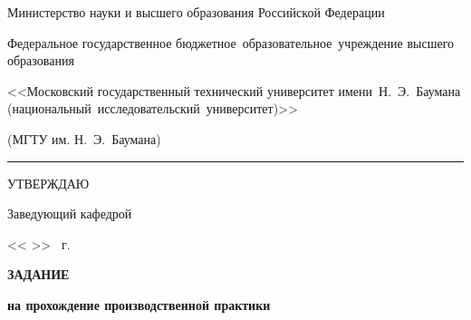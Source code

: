 \thispagestyle{empty}

\fontsize{12pt}{12pt}\selectfont
\begin{center}
	{
		
		
		\begin{minipage}{0.99\textwidth}\centering\bfseries
			{
				\linespread{1}\selectfont
				{Министерство науки и высшего образования Российской Федерации}
				
				{Федеральное государственное бюджетное~образовательное~учреждение высшего образования}
				
				{<<Московский государственный технический университет имени~Н.~Э.~Баумана (национальный~исследовательский~университет)>>}
				
				{(МГТУ им. Н.~Э.~Баумана)}
			}
		\end{minipage}
	}
	
	\vspace{0.2cm}
	
	\rule{\linewidth}{3.4pt}
\end{center}

\fontsize{11pt}{11pt}\selectfont
\begin{flushright}
	\begin{minipage}{0.4\textwidth}\raggedleft
		
		УТВЕРЖДАЮ \hspace{2.5cm}
		
		Заведующий кафедрой~
		
		\vspace{0.3cm}
		
		\ulinetext{}{} 
		
		\vspace{0.3cm}
		
		<< \ulinetext[1cm]{}{} >> \ulinetext{}{} \the\year \ г.
	\end{minipage}
\end{flushright}

\begin{center}\linespread{1}\selectfont
	\Large{\textbf{ЗАДАНИЕ}}
	
	\large{\textbf{на прохождение производственной практики}}
	
	\large{}
\end{center}

